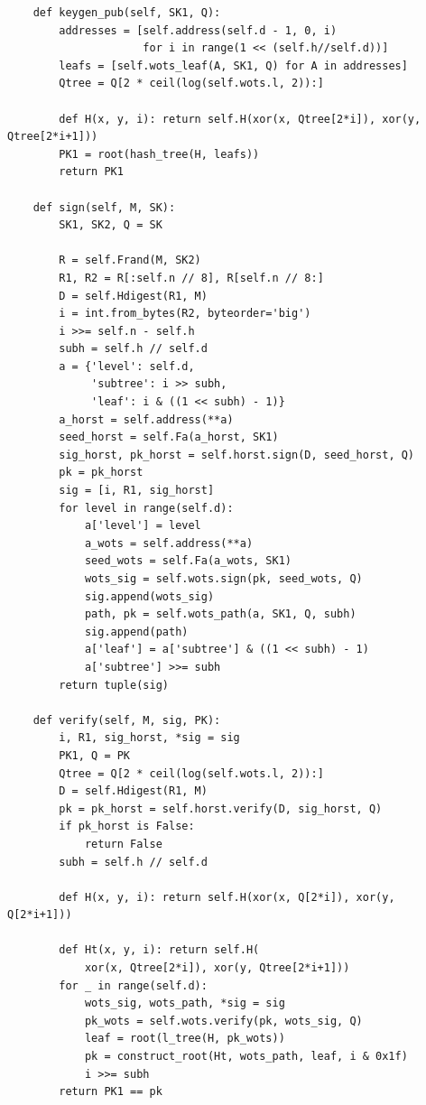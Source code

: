 \documentclass[a4paper, 14pt]{extarticle}
\begin{document}
\begin{verbatim}
    def keygen_pub(self, SK1, Q):
        addresses = [self.address(self.d - 1, 0, i)
                     for i in range(1 << (self.h//self.d))]
        leafs = [self.wots_leaf(A, SK1, Q) for A in addresses]
        Qtree = Q[2 * ceil(log(self.wots.l, 2)):]

        def H(x, y, i): return self.H(xor(x, Qtree[2*i]), xor(y, Qtree[2*i+1]))
        PK1 = root(hash_tree(H, leafs))
        return PK1

    def sign(self, M, SK):
        SK1, SK2, Q = SK

        R = self.Frand(M, SK2)
        R1, R2 = R[:self.n // 8], R[self.n // 8:]
        D = self.Hdigest(R1, M)
        i = int.from_bytes(R2, byteorder='big')
        i >>= self.n - self.h
        subh = self.h // self.d
        a = {'level': self.d,
             'subtree': i >> subh,
             'leaf': i & ((1 << subh) - 1)}
        a_horst = self.address(**a)
        seed_horst = self.Fa(a_horst, SK1)
        sig_horst, pk_horst = self.horst.sign(D, seed_horst, Q)
        pk = pk_horst
        sig = [i, R1, sig_horst]
        for level in range(self.d):
            a['level'] = level
            a_wots = self.address(**a)
            seed_wots = self.Fa(a_wots, SK1)
            wots_sig = self.wots.sign(pk, seed_wots, Q)
            sig.append(wots_sig)
            path, pk = self.wots_path(a, SK1, Q, subh)
            sig.append(path)
            a['leaf'] = a['subtree'] & ((1 << subh) - 1)
            a['subtree'] >>= subh
        return tuple(sig)

    def verify(self, M, sig, PK):
        i, R1, sig_horst, *sig = sig
        PK1, Q = PK
        Qtree = Q[2 * ceil(log(self.wots.l, 2)):]
        D = self.Hdigest(R1, M)
        pk = pk_horst = self.horst.verify(D, sig_horst, Q)
        if pk_horst is False:
            return False
        subh = self.h // self.d

        def H(x, y, i): return self.H(xor(x, Q[2*i]), xor(y, Q[2*i+1]))

        def Ht(x, y, i): return self.H(
            xor(x, Qtree[2*i]), xor(y, Qtree[2*i+1]))
        for _ in range(self.d):
            wots_sig, wots_path, *sig = sig
            pk_wots = self.wots.verify(pk, wots_sig, Q)
            leaf = root(l_tree(H, pk_wots))
            pk = construct_root(Ht, wots_path, leaf, i & 0x1f)
            i >>= subh
        return PK1 == pk
\end{verbatim}
\newpage
\end{document}
